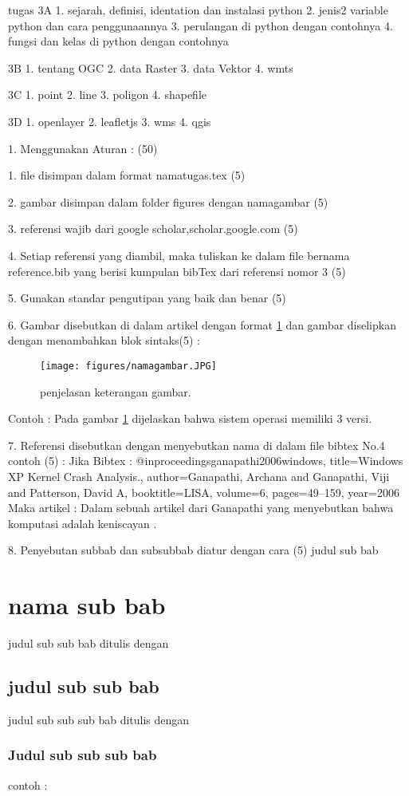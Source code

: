 tugas
3A
1. sejarah, definisi, identation dan instalasi python
2. jenis2 variable python dan cara penggunaannya
3. perulangan di python dengan contohnya
4. fungsi dan kelas di python dengan contohnya


3B 
1. tentang OGC
2. data Raster
3. data Vektor
4. wmts

3C
1. point
2. line
3. poligon
4. shapefile

3D
1. openlayer
2. leafletjs
3. wms
4. qgis




1. Menggunakan Aturan : (50)

		1. file disimpan dalam format namatugas.tex (5)

		2. gambar disimpan dalam folder figures dengan namagambar (5)

		3. referensi wajib dari google scholar,scholar.google.com (5)

		4. Setiap referensi yang diambil, maka tuliskan ke dalam 
			file bernama reference.bib
		   yang berisi kumpulan bibTex dari referensi nomor 3 (5)

		5. Gunakan standar pengutipan yang baik dan benar (5)

		6. Gambar disebutkan di dalam artikel dengan format \ref{namagambar}
		   dan gambar diselipkan dengan menambahkan blok sintaks(5) :
			\begin{figure}[ht]
			\centerline{\texttt{[image: figures/namagambar.JPG]}}
			\caption{penjelasan keterangan gambar.}
			\label{namagambar}
			\end{figure}
			Contoh :
			Pada gambar \ref{namagambar} dijelaskan bahwa sistem operasi memiliki 
			3 versi.
	
		7. Referensi disebutkan dengan menyebutkan nama di dalam file bibtex No.4
		   contoh (5) :
			Jika Bibtex :
			@inproceedings{ganapathi2006windows,
			  title={Windows XP Kernel Crash Analysis.},
			  author={Ganapathi, Archana and Ganapathi, Viji and Patterson, David A},
			  booktitle={LISA},
			  volume={6},
			  pages={49--159},
			  year={2006}
			}
			Maka artikel :
			Dalam sebuah artikel dari Ganapathi yang menyebutkan bahwa komputasi 
			adalah keniscayan \cite{ganapathi2006windows}.
	
	
		8. Penyebutan subbab dan subsubbab diatur dengan cara (5)
			judul sub bab \section{nama sub bab}
			judul sub sub bab ditulis dengan \subsection{judul sub sub bab}
			judul sub sub sub bab ditulis dengan \subsubsection{Judul sub sub sub bab}
			contoh :
